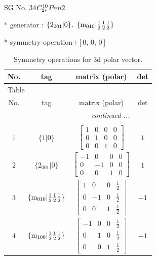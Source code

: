 \documentclass[fleqn,8pt]{jsarticle}
\begin{document}
\setcounter{MaxMatrixCols}{32}

\renewcommand{\tablename}{Table~}
\renewcommand{\figurename}{Figure~}
\begin{center}
\LARGE
SG No. 34\quad$C_{\rm 2v}^{10}$\quad$Pnn2$\quad[ orthorhombic ]
\end{center}

* generator : $\{2{}_{001}|0\},\,\,\{{\rm m}_{010}|\frac{1}{2} \frac{1}{2} \frac{1}{2}\}$

* symmetry operation\quad$+\left[ 0,\, 0,\, 0 \right]$
\renewcommand{\arraystretch}{1.3}
\begin{longtable}{cccc}
\caption{Symmetry operations for 3d polar vector.}
 \\
 \hline \hline
No. & tag & matrix (polar) & det \\ \hline \endfirsthead

\multicolumn{3}{l}{\tablename\ \thetable{}} \\
 \hline \hline
No. & tag & matrix (polar) & det \\ \hline \endhead

 \hline \hline
\multicolumn{3}{r}{\footnotesize\it continued ...} \\ \endfoot

 \hline \hline
\multicolumn{3}{r}{} \\ \endlastfoot

$ 1 $ & $ \{1|0\} $ & $ \begin{bmatrix} 1 & 0 & 0 & 0 \\ 0 & 1 & 0 & 0 \\ 0 & 0 & 1 & 0 \end{bmatrix} $ & $ 1 $ \\ \hline
$ 2 $ & $ \{2{}_{001}|0\} $ & $ \begin{bmatrix} -1 & 0 & 0 & 0 \\ 0 & -1 & 0 & 0 \\ 0 & 0 & 1 & 0 \end{bmatrix} $ & $ 1 $ \\ \hline
$ 3 $ & $ \{{\rm m}_{010}|\frac{1}{2} \frac{1}{2} \frac{1}{2}\} $ & $ \begin{bmatrix} 1 & 0 & 0 & \frac{1}{2} \\ 0 & -1 & 0 & \frac{1}{2} \\ 0 & 0 & 1 & \frac{1}{2} \end{bmatrix} $ & $ -1 $ \\ \hline
$ 4 $ & $ \{{\rm m}_{100}|\frac{1}{2} \frac{1}{2} \frac{1}{2}\} $ & $ \begin{bmatrix} -1 & 0 & 0 & \frac{1}{2} \\ 0 & 1 & 0 & \frac{1}{2} \\ 0 & 0 & 1 & \frac{1}{2} \end{bmatrix} $ & $ -1 $ \\
\end{longtable}
\end{document}
